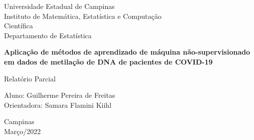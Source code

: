 \begin{titlepage}
    \begin{center}
        \vspace*{1cm}
        
        \LARGE
        Universidade Estadual de Campinas\\
        
        \large
        Instituto de Matemática, Estatística e Computação \\ Científica\\
        Departamento de Estatística
            
        \vspace{3.0cm}
        
        \Large
        \textbf{Aplicação de métodos de aprendizado de máquina não-supervisionado em dados de metilação de DNA de pacientes de COVID-19}
        
        \vspace{0.5cm}
        
        \large
        Relatório Parcial
        
        \vspace{2.5cm}
        
        \Large
        Aluno: Guilherme Pereira de Freitas\\
        Orientadora: Samara Flamini Kiihl
        
            
        \vfill
        
        \small
        Campinas\\
        Março/2022
            
        \vspace{0.8cm}
            

            
    \end{center}
\end{titlepage}
